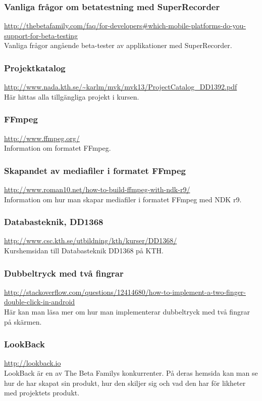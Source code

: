 \subsubsection{Vanliga frågor om betatestning med SuperRecorder}
\url{http://thebetafamily.com/faq/for-developers\#which-mobile-platforms-do-you-support-for-beta-testing} \\
Vanliga frågor angående beta-tester av applikationer med SuperRecorder.

\subsubsection{Projektkatalog}
\url{http://www.nada.kth.se/~karlm/mvk/mvk13/ProjectCatalog_DD1392.pdf} \\
Här hittas alla tillgängliga projekt i kursen.

\subsubsection{FFmpeg}
\url{http://www.ffmpeg.org/} \\
Information om formatet FFmpeg.

\subsubsection{Skapandet av mediafiler i formatet FFmpeg}
\url{http://www.roman10.net/how-to-build-ffmpeg-with-ndk-r9/} \\
Information om hur man skapar mediafiler i formatet FFmpeg med NDK r9.

\subsubsection{Databasteknik, DD1368}
\url{http://www.csc.kth.se/utbildning/kth/kurser/DD1368/} \\
Kurshemsidan till Databasteknik DD1368 på KTH.

\subsubsection{Dubbeltryck med två fingrar}
\url{http://stackoverflow.com/questions/12414680/how-to-implement-a-two-finger-double-click-in-android} \\
Här kan man läsa mer om hur man implementerar dubbeltryck med två fingrar på skärmen.

\subsubsection{LookBack}
\url{http://lookback.io} \\
LookBack är en av The Beta Familys konkurrenter. På deras hemsida kan man se hur de har skapat sin produkt, hur den skiljer sig och vad den har för likheter med projektets produkt.

